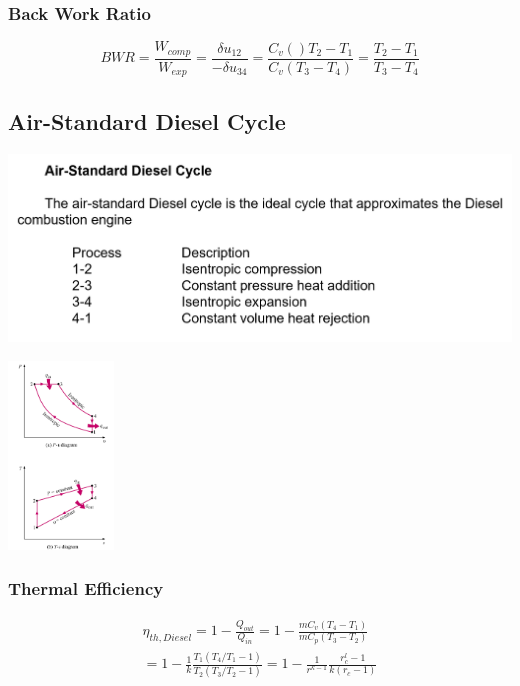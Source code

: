 \documentclass[10pt,landscape]{article}
\newenvironment{Figure}
     {\par\medskip\noindent\minipage{\linewidth}}
     {\endminipage\par\medskip}
\begin{document}
\begin{multicols}{3}
\subsubsection{Back Work Ratio}
\begin{equation}
    BWR=\frac{W_{comp}}{W_{exp}}=\frac{\delta u_{12}}{-\delta u_{34}}=\frac{C_v()T_2-T_1}{C_v(T_3-T_4)}=\frac{T_2-T_1}{T_3-T_4}
\end{equation}

\subsection{Air-Standard Diesel Cycle}
\begin{Figure}
    \centering
    \includegraphics[width=\linewidth, height=5cm]{Air-Standard_DieselCycle.png}
\end{Figure}
\begin{Figure}
    \centering
    \includegraphics[width=\linewidth, height=5cm]{Air-Standard_DieselCycle_PVTS.png}
\end{Figure}
\subsubsection{Thermal Efficiency}
\begin{equation}
    \begin{split}
        \eta_{th,Diesel}=1-\frac{Q_{out}}{Q_{in}}=1-\frac{mC_v(T_4-T_1)}{mC_p(T_3-T_2)}\\
        =1-\frac{1}{k}\frac{T_1(T_4/T_1-1)}{T_2(T_3/T_2-1)}=1-\frac{1}{r^{k-1}}\frac{r^l_c-1}{k(r_c-1)}
    \end{split}
\end{equation}


\end{multicols}
\end{document}
